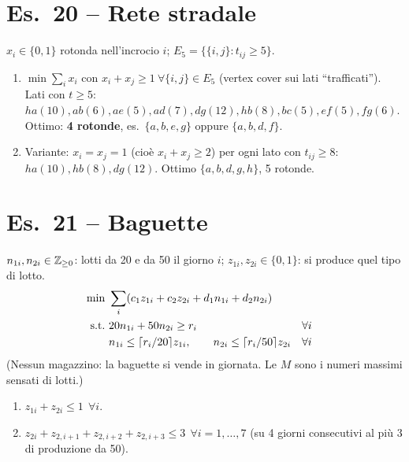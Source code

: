 \section*{Es.\ 20 -- Rete stradale}
$x_i\in\{0,1\}$ rotonda nell'incrocio $i$; $E_5=\{\{i,j\}: t_{ij}\ge5\}$.
\begin{enumerate}[nosep]
\item $\min\sum_ix_i$ con $x_i+x_j\ge1\ \forall\{i,j\}\in E_5$ (vertex cover sui lati ``trafficati'').
Lati con $t\ge5$: $ha(10),ab(6),ae(5),ad(7),dg(12),hb(8),bc(5),ef(5),fg(6)$. Ottimo: \textbf{4 rotonde}, es.\ $\{a,b,e,g\}$ oppure $\{a,b,d,f\}$.
\item Variante: $x_i=x_j=1$ (cioè $x_i+x_j\ge2$) per ogni lato con $t_{ij}\ge8$: $ha(10),hb(8),dg(12)$. Ottimo $\{a,b,d,g,h\}$, 5 rotonde.
\end{enumerate}

\section*{Es.\ 21 -- Baguette}
$n_{1i},n_{2i}\in\mathbb{Z}_{\ge0}$: lotti da 20 e da 50 il giorno $i$; $z_{1i},z_{2i}\in\{0,1\}$: si produce quel tipo di lotto.
\begin{align*}
\min\ & \sum_i(c_1z_{1i}+c_2z_{2i}+d_1n_{1i}+d_2n_{2i})\\
\text{s.t.}\ & 20n_{1i}+50n_{2i}\ge r_i && \forall i\\
& n_{1i}\le\lceil r_i/20\rceil z_{1i},\qquad n_{2i}\le\lceil r_i/50\rceil z_{2i} && \forall i
\end{align*}
(Nessun magazzino: la baguette si vende in giornata. Le $M$ sono i numeri massimi sensati di lotti.)
\begin{enumerate}[nosep,start=2]
\item $z_{1i}+z_{2i}\le1\ \ \forall i$.
\item $z_{2i}+z_{2,i+1}+z_{2,i+2}+z_{2,i+3}\le3\ \ \forall i=1,\dots,7$ (su 4 giorni consecutivi al più 3 di produzione da 50).
\end{enumerate}

